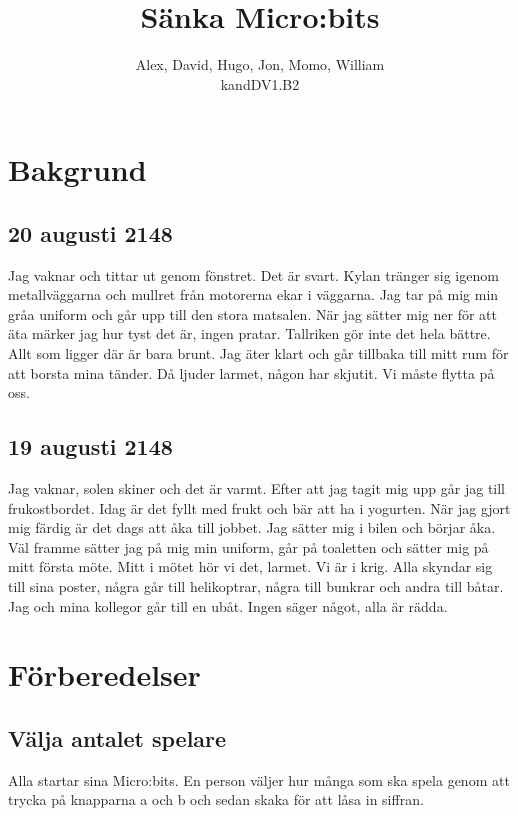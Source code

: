\documentclass[a4paper, 12pt]{article}
\title{Sänka Micro:bits}
\author{Alex, David, Hugo, Jon, Momo, William \\ kandDV1.B2}
\begin{document}
    \maketitle
    \tableofcontents
    \newpage
    \section{Bakgrund}
    \subsection*{20 augusti 2148}
    Jag vaknar och tittar ut genom fönstret. Det är svart. 
    Kylan tränger sig igenom metallväggarna och mullret från motorerna ekar i väggarna.
    Jag tar på mig min gråa uniform och går upp till den stora matsalen.
    När jag sätter mig ner för att äta märker jag hur tyst det är, ingen pratar.
    Tallriken gör inte det hela bättre. Allt som ligger där är bara brunt.
    Jag äter klart och går tillbaka till mitt rum för att borsta mina tänder.
    Då ljuder larmet, någon har skjutit. Vi måste flytta på oss.

    \subsection*{19 augusti 2148}
    Jag vaknar, solen skiner och det är varmt.
    Efter att jag tagit mig upp går jag till frukostbordet. Idag är det fyllt med frukt och bär att ha i yogurten.
    När jag gjort mig färdig är det dags att åka till jobbet. Jag sätter mig i bilen och börjar åka.
    Väl framme sätter jag på mig min uniform, går på toaletten och sätter mig på mitt första möte.
    Mitt i mötet hör vi det, larmet. Vi är i krig.
    Alla skyndar sig till sina poster, några går till helikoptrar, några till bunkrar och andra till båtar.
    Jag och mina kollegor går till en ubåt. Ingen säger något, alla är rädda.

    \newpage
    \section{Förberedelser}
    \subsection{Välja antalet spelare}
    Alla startar sina Micro:bits.
    En person väljer hur många som ska spela genom att 
    trycka på knapparna a och b och sedan skaka för att 
    låsa in siffran. \\
\end{document}
